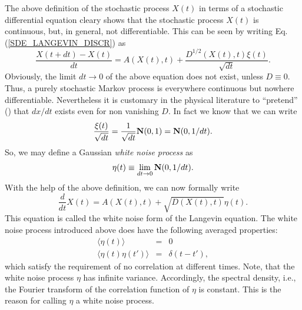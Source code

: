 The above definition of the stochastic process $X(t)$
in terms of a stochastic differential equation  cleary shows that
the stochastic process $X(t)$ is continuous, but, in general, not 
differentiable. This can be seen by writing
Eq. (\ref{SDE_LANGEVIN_DISCR}) as
\begin{equation*}
\frac{X(t+dt) - X(t)}{dt} = A(X(t),t) + \frac{D^{1/2}(X(t),t) \xi(t)}
                                              {\sqrt{dt}}.
\end{equation*}
Obviously, the limit $dt \rightarrow 0$ of the above equation does not
exist, unless $D\equiv 0$. Thus, a purely stochastic Markov process
is everywhere continuous but nowhere differentiable. Nevertheless it is
customary in the physical literature to ``pretend'' (\cite{GILLESPIE})
that $dx/dt$ exists even for
non vanishing $D$. In fact we know that we can write
\begin{equation*}
\frac{\xi(t)}{\sqrt{dt}} = \frac{1}{\sqrt{dt}} {\bf N}(0,1) =
{\bf N}(0,1/dt).
\end{equation*}
So, we may define a Gaussian {\em white noise process} as
\begin{equation*}
\eta(t) \equiv \lim_{dt \rightarrow 0}  {\bf N}(0,1/dt).
\end{equation*}
With the help of the above definition, we can now formally write
\begin{equation*}
\frac{d}{dt} X(t) = A(X(t),t) + \sqrt{D(X(t),t)} \eta(t).
\end{equation*}
This equation is called the white noise form of the Langevin equation.
The white noise process introduced above does have the following
averaged properties:
\begin{eqnarray*}
\langle \eta(t) \rangle &=& 0 \\
\langle \eta(t) \eta(t') \rangle &=& \delta(t-t'),
\end{eqnarray*}
which satisfy the requirement of no correlation at different
times. Note, that the white noise process  $\eta$ has
infinite variance. Accordingly, the spectral density, i.e.,
the Fourier transform of the correlation function of $\eta$ is 
constant. This is the reason for calling $\eta$ a white noise
process.

